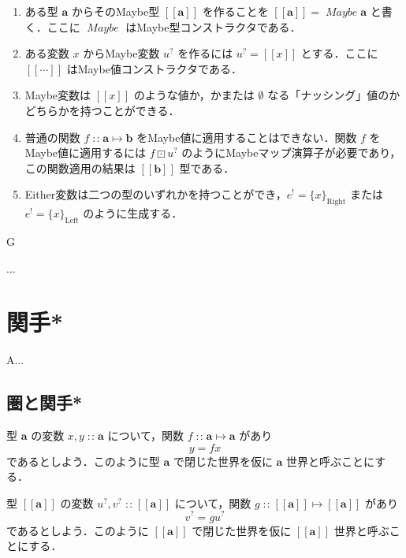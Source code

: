 \documentclass[a4paper,twocolumn]{jsbook}
\def\[{\left[\!\left[}
\def\]{\right]\!\right]}
\newenvironment{leader}{\begingroup\gt}{\endgroup}
\newenvironment{note}[1]{\begin{boxnote}\begin{center}#1\end{center}}{\end{boxnote}}
\newcommand{\mNothing}{\emptyset}
\DeclareMathOperator{\mIn}{{:\!:}}
\DeclareMathOperator{\mMapMaybe}{\boxdot}
\DeclareMathOperator{\mMapsTo}{\mapsto}
\newcommand{\mSpecialSub}[1]{\text{#1}}
\newcommand{\mLeft}{\mSpecialSub{Left}}
\newcommand{\mRight}{\mSpecialSub{Right}}
\newcommand{\mType}[1]{\mathbf{#1}}
\newcommand{\mEitherLeftWith}[1]{\{#1\}_\mLeft}
\newcommand{\mEitherRightWith}[1]{\{#1\}_\mRight}
\newcommand{\mMaybeWith}[1]{\[#1\]}
\newcommand{\mMaybeType}[1]{\mMaybeWith{\mType{#1}}}
\newcommand{\mTypeConstructor}[1]{\mathit{#1}} %
\DeclareMathOperator{\mMaybeTypeConstructor}{\mTypeConstructor{Maybe}}
\newcommand{\mEither}[1]{{#1}^\text{!}}
\newcommand{\mMaybe}[1]{{#1}^\text{?}}
\newcommand{\mProj}[2]{#1\mMapsTo#2}
\begin{document}
\begin{enumerate}
\item ある型 $\mType{a}$ からそのMaybe型 $\mMaybeType{a}$ を作ることを $\mMaybeType{a}=\mMaybeTypeConstructor\mType{a}$ と書く．ここに $\mMaybeTypeConstructor$ はMaybe型コンストラクタである．
\item ある変数 $x$ からMaybe変数 $\mMaybe{u}$ を作るには $\mMaybe{u}=\mMaybeWith{x}$ とする．ここに $\mMaybeWith{\dotsb}$ はMaybe値コンストラクタである．
\item Maybe変数は $\mMaybeWith{x}$ のような値か，かまたは $\mNothing$ なる「ナッシング」値のかどちらかを持つことができる．
\item 普通の関数 $f\mIn\mProj{\mType{a}}{\mType{b}}$ をMaybe値に適用することはできない．関数 $f$ をMaybe値に適用するには $f\mMapMaybe\mMaybe{u}$ のようにMaybeマップ演算子が必要であり，この関数適用の結果は $\mMaybeType{b}$ 型である．
\item Either変数は二つの型のいずれかを持つことができ，$\mEither{e}=\mEitherRightWith{x}$ または $\mEither{e}=\mEitherLeftWith{x}$ のように生成する．
\end{enumerate}

\begin{note}{G}
...
\end{note}


\chapter{関手*}
\label{ch:functor}

\begin{leader}
A...
\end{leader}

\section{圏と関手*}

型 $\mType{a}$ の変数 $x,y\mIn\mType{a}$ について，関数 $f\mIn\mProj{\mType{a}}{\mType{a}}$ があり
\begin{equation}
y=fx
\end{equation}
であるとしよう．このように型 $\mType{a}$ で閉じた世界を仮に $\mType{a}$ 世界と呼ぶことにする．

型 $\mMaybeType{a}$ の変数 $\mMaybe{u},\mMaybe{v}\mIn\mMaybeType{a}$ について，関数 $g\mIn\mProj{\mMaybeType{a}}{\mMaybeType{a}}$ があり
\begin{equation}
\mMaybe{v}=g\mMaybe{u}
\end{equation}
であるとしよう．このように $\mMaybeType{a}$ で閉じた世界を仮に $\mMaybeType{a}$ 世界と呼ぶことにする．
\end{document}
